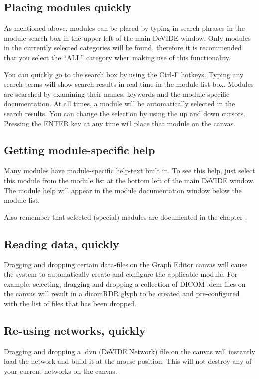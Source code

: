 \subsection{Placing modules quickly}
As mentioned above, modules can be placed by typing in search phrases
in the module search box in the upper left of the main DeVIDE window.
Only modules in the currently selected categories will be found,
therefore it is recommended that you select the ``ALL'' category when
making use of this functionality.

You can quickly go to the search box by using the Ctrl-F hotkeys.
Typing any search terms will show search results in real-time in the
module list box.  Modules are searched by examining their names,
keywords and the module-specific documentation.  At all times, a
module will be automatically selected in the search results.  You can
change the selection by using the up and down cursors.  Pressing the
ENTER key at any time will place that module on the canvas.

\subsection{Getting module-specific help}
Many modules have module-specific help-text built in.  To see this
help, just select this module from the module list at the bottom left
of the main DeVIDE window.  The module help will appear in the module
documentation window below the module list.

Also remember that selected (special) modules are documented in the
chapter .

\subsection{Reading data, quickly}
Dragging and dropping certain data-files on the Graph Editor canvas
will cause the system to automatically create and configure the
applicable module.  For example: selecting, dragging and dropping a
collection of DICOM .dcm files on the canvas will result in a dicomRDR
glyph to be created and pre-configured with the list of files that has
been dropped.

\subsection{Re-using networks, quickly}
Dragging and dropping a .dvn (DeVIDE Network) file on the canvas will
instantly load the network and build it at the mouse position.  This
will not destroy any of your current networks on the canvas.


